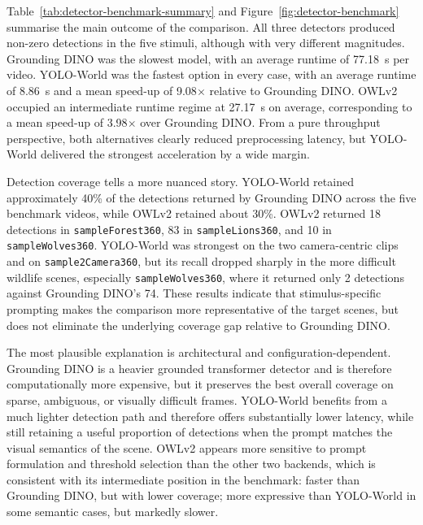 \documentclass[11pt]{article}
\begin{document}
Table~\ref{tab:detector-benchmark-summary} and Figure~\ref{fig:detector-benchmark} summarise the main outcome of the comparison. All three detectors produced non-zero detections in the five stimuli, although with very different magnitudes. Grounding DINO was the slowest model, with an average runtime of 77.18~s per video. YOLO-World was the fastest option in every case, with an average runtime of 8.86~s and a mean speed-up of 9.08$\times$ relative to Grounding DINO. OWLv2 occupied an intermediate runtime regime at 27.17~s on average, corresponding to a mean speed-up of 3.98$\times$ over Grounding DINO. From a pure throughput perspective, both alternatives clearly reduced preprocessing latency, but YOLO-World delivered the strongest acceleration by a wide margin.

Detection coverage tells a more nuanced story. YOLO-World retained approximately 40\% of the detections returned by Grounding DINO across the five benchmark videos, while OWLv2 retained about 30\%. OWLv2 returned 18 detections in \texttt{sampleForest360}, 83 in \texttt{sampleLions360}, and 10 in \texttt{sampleWolves360}. YOLO-World was strongest on the two camera-centric clips and on \texttt{sample2Camera360}, but its recall dropped sharply in the more difficult wildlife scenes, especially \texttt{sampleWolves360}, where it returned only 2 detections against Grounding DINO's 74. These results indicate that stimulus-specific prompting makes the comparison more representative of the target scenes, but does not eliminate the underlying coverage gap relative to Grounding DINO.

The most plausible explanation is architectural and configuration-dependent. Grounding DINO is a heavier grounded transformer detector and is therefore computationally more expensive, but it preserves the best overall coverage on sparse, ambiguous, or visually difficult frames. YOLO-World benefits from a much lighter detection path and therefore offers substantially lower latency, while still retaining a useful proportion of detections when the prompt matches the visual semantics of the scene. OWLv2 appears more sensitive to prompt formulation and threshold selection than the other two backends, which is consistent with its intermediate position in the benchmark: faster than Grounding DINO, but with lower coverage; more expressive than YOLO-World in some semantic cases, but markedly slower.
\end{document}
